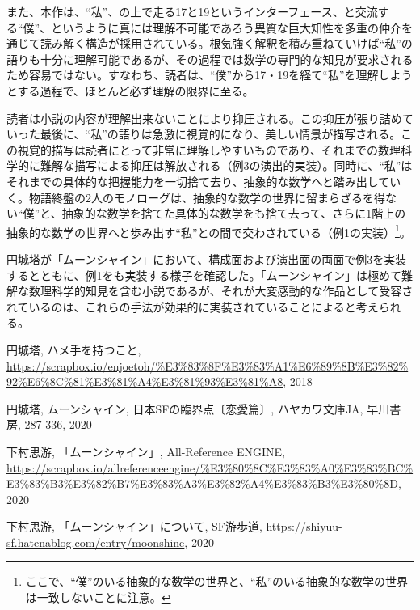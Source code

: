 \documentclass[10pt, a5paper, twoside]{jsarticle}
\theoremstyle{definition}
\begin{document}
		また、本作は、“私”、の上で走る17と19というインターフェース、と交流する“僕”、というように真には理解不可能であろう異質な巨大知性を多重の仲介を通じて読み解く構造が採用されている。根気強く解釈を積み重ねていけば“私”の語りも十分に理解可能であるが、その過程では数学の専門的な知見が要求されるため容易ではない。すなわち、読者は、“僕”から17・19を経て“私”を理解しようとする過程で、ほとんど必ず理解の限界に至る。

		読者は小説の内容が理解出来ないことにより抑圧される。この抑圧が張り詰めていった最後に、“私”の語りは急激に視覚的になり、美しい情景が描写される。この視覚的描写は読者にとって非常に理解しやすいものであり、それまでの数理科学的に難解な描写による抑圧は解放される（例3の演出的実装）。同時に、“私”はそれまでの具体的な把握能力を一切捨て去り、抽象的な数学へと踏み出していく。物語終盤の2人のモノローグは、抽象的な数学の世界に留まらざるを得ない“僕”と、抽象的な数学を捨てた具体的な数学をも捨て去って、さらに1階上の抽象的な数学の世界へと歩み出す“私”との間で交わされている（例1の実装）\footnote{ここで、“僕”のいる抽象的な数学の世界と、“私”のいる抽象的な数学の世界は一致しないことに注意。}。

		円城塔が「ムーンシャイン」において、構成面および演出面の両面で例3を実装するとともに、例1をも実装する様子を確認した。「ムーンシャイン」は極めて難解な数理科学的知見を含む小説であるが、それが大変感動的な作品として受容されているのは、これらの手法が効果的に実装されていることによると考えられる。		

	\begin{thebibliography}{99}

		 円城塔, ハメ手を持つこと, \url{https://scrapbox.io/enjoetoh/%E3%83%8F%E3%83%A1%E6%89%8B%E3%82%92%E6%8C%81%E3%81%A4%E3%81%93%E3%81%A8}, 2018

		 円城塔, ムーンシャイン, 日本SFの臨界点〔恋愛篇〕, ハヤカワ文庫JA, 早川書房, 287-336, 2020

		 下村思游, 「ムーンシャイン」, All-Reference ENGINE, \url{https://scrapbox.io/allreferenceengine/%E3%80%8C%E3%83%A0%E3%83%BC%E3%83%B3%E3%82%B7%E3%83%A3%E3%82%A4%E3%83%B3%E3%80%8D}, 2020

		 下村思游, 「ムーンシャイン」について, SF游歩道, \url{https://shiyuu-sf.hatenablog.com/entry/moonshine}, 2020

	\end{thebibliography}
\end{document}
